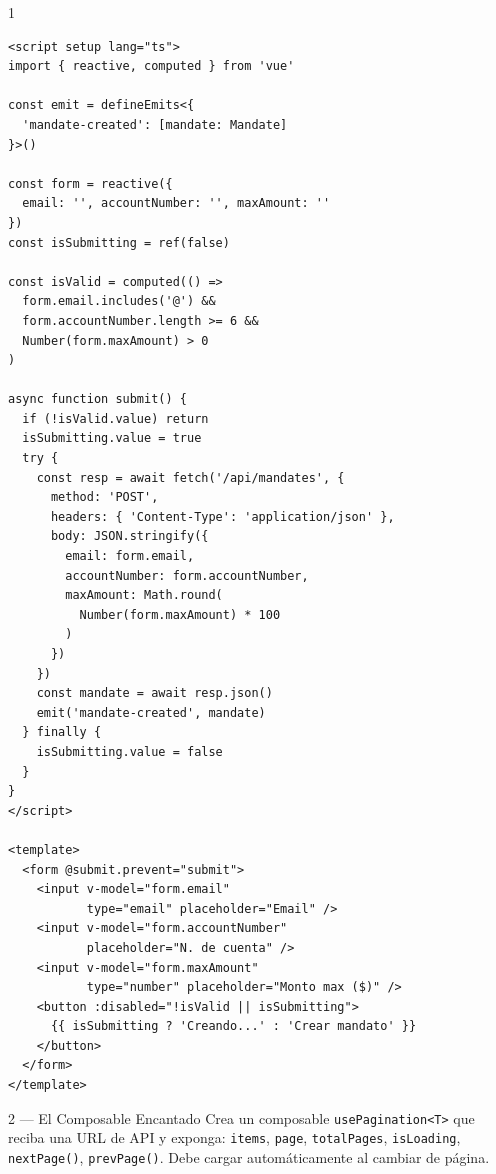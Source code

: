 \documentclass[11pt,a4paper]{article}
\begin{document}
\begin{recompensa}{1}
\begin{lstlisting}[style=vue]
<script setup lang="ts">
import { reactive, computed } from 'vue'

const emit = defineEmits<{
  'mandate-created': [mandate: Mandate]
}>()

const form = reactive({
  email: '', accountNumber: '', maxAmount: ''
})
const isSubmitting = ref(false)

const isValid = computed(() =>
  form.email.includes('@') &&
  form.accountNumber.length >= 6 &&
  Number(form.maxAmount) > 0
)

async function submit() {
  if (!isValid.value) return
  isSubmitting.value = true
  try {
    const resp = await fetch('/api/mandates', {
      method: 'POST',
      headers: { 'Content-Type': 'application/json' },
      body: JSON.stringify({
        email: form.email,
        accountNumber: form.accountNumber,
        maxAmount: Math.round(
          Number(form.maxAmount) * 100
        )
      })
    })
    const mandate = await resp.json()
    emit('mandate-created', mandate)
  } finally {
    isSubmitting.value = false
  }
}
</script>

<template>
  <form @submit.prevent="submit">
    <input v-model="form.email"
           type="email" placeholder="Email" />
    <input v-model="form.accountNumber"
           placeholder="N. de cuenta" />
    <input v-model="form.maxAmount"
           type="number" placeholder="Monto max ($)" />
    <button :disabled="!isValid || isSubmitting">
      {{ isSubmitting ? 'Creando...' : 'Crear mandato' }}
    </button>
  </form>
</template>
\end{lstlisting}
\end{recompensa}

\begin{mision}{2 — El Composable Encantado}
Crea un composable \texttt{usePagination<T>} que reciba una URL de API
y exponga: \texttt{items}, \texttt{page}, \texttt{totalPages},
\texttt{isLoading}, \texttt{nextPage()}, \texttt{prevPage()}.
Debe cargar automáticamente al cambiar de página.
\end{mision}
\end{document}
